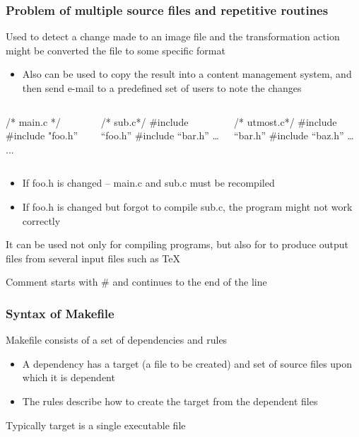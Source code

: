 \documentclass[newPxFont,sthlmFooter,nooffset]{beamer}
\begin{document}
\begin{frame}[t, fragile]
  \frametitle{Problem of multiple source files and repetitive
    routines}
  
Used to detect a change made to an image file and the transformation action might be converted the file to some specific format
\begin{itemize}
\item {\small Also can be used to copy the result into a content management
  system, and then send e-mail to a predefined set of users to note
  the changes}
\end{itemize}

\begin{columns}
\begin{column}{0.3\textwidth}
\begin{codedefnb}
/* main.c */
#include "foo.h''
...      
\end{codedefnb}
\end{column}
\begin{column}{0.3\textwidth}
\begin{codedefnb}
/* sub.c*/
#include “foo.h”
#include “bar.h”
…      
\end{codedefnb}
\end{column}
\begin{column}{0.3\textwidth}
\begin{codedefnb}
/* utmost.c*/
#include “bar.h”
#include “baz.h”
…     
\end{codedefnb}
\end{column}
\end{columns}
\begin{itemize}
\item If foo.h is changed – main.c and sub.c must be recompiled

\item If foo.h is changed but forgot to compile sub.c, the program might not work correctly

\end{itemize}





It can be used not only for compiling programs, but also for to produce output files from several input files such as TeX

Comment starts with \# and continues to the end  of the line




\end{frame}

\begin{frame}[t]
  \frametitle{Syntax of Makefile}

Makefile consists of a set of dependencies and rules
\begin{itemize}
\item A dependency has a target (a file to be created) and set of
  source files upon which it is dependent
\item The rules describe how to
  create the target from the dependent files
\end{itemize}

Typically target is a single executable file
\end{frame}
\end{document}
